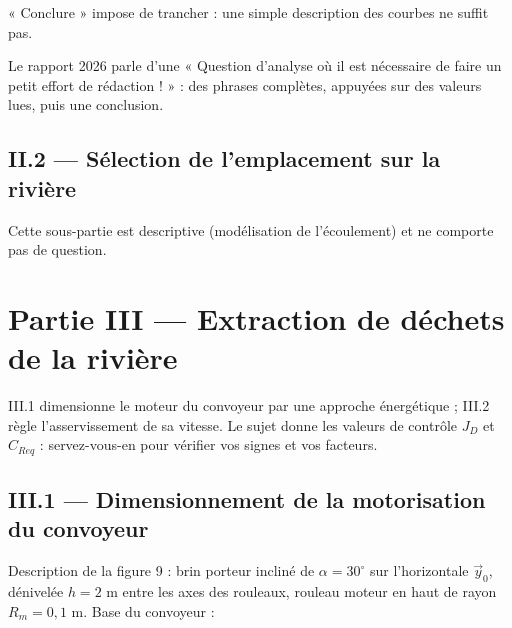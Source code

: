 \documentclass[11pt,a4paper]{article}
\newcommand{\equationajustee}[1]{%
  \sbox{\boiteequation}{$\displaystyle #1$}%
  \ifdim\wd\boiteequation>\linewidth
    \[\resizebox{\linewidth}{!}{\usebox{\boiteequation}}\]%
  \else
    \[#1\]%
  \fi}
\begin{document}
\begin{piege}

« Conclure » impose de trancher : une simple description des courbes ne suffit pas.

\end{piege}

\begin{jury}

Le rapport 2026 parle d'une « Question d'analyse où il est nécessaire de faire un petit effort de rédaction ! » : des phrases complètes, appuyées sur des valeurs lues, puis une conclusion.

\end{jury}

\hypertarget{ii.2-suxe9lection-de-lemplacement-sur-la-riviuxe8re}{%
\subsection{II.2 --- Sélection de l'emplacement sur la rivière}\label{ii.2-suxe9lection-de-lemplacement-sur-la-riviuxe8re}}

Cette sous-partie est descriptive (modélisation de l'écoulement) et ne comporte pas de question.

\hypertarget{partie-iii-extraction-de-duxe9chets-de-la-riviuxe8re}{%
\section{Partie III --- Extraction de déchets de la rivière}\label{partie-iii-extraction-de-duxe9chets-de-la-riviuxe8re}}

III.1 dimensionne le moteur du convoyeur par une approche énergétique ; III.2 règle l'asservissement de sa vitesse. Le sujet donne les valeurs de contrôle \(J_D\) et \(C_{Req}\) : servez-vous-en pour vérifier vos signes et vos facteurs.

\hypertarget{iii.1-dimensionnement-de-la-motorisation-du-convoyeur}{%
\subsection{III.1 --- Dimensionnement de la motorisation du convoyeur}\label{iii.1-dimensionnement-de-la-motorisation-du-convoyeur}}

Description de la figure 9 : brin porteur incliné de \(\alpha=30^\circ\) sur l'horizontale \(\vec y_0\), dénivelée \(h=2\) m entre les axes des rouleaux, rouleau moteur en haut de rayon \(R_m=0{,}1\) m. Base du convoyeur :

\equationajustee{\begin{aligned}
\vec y_c&=\cos\alpha\,\vec y_0+\sin\alpha\,\vec z_0\\
\vec z_c&=-\sin\alpha\,\vec y_0+\cos\alpha\,\vec z_0
\end{aligned}}
\end{document}
